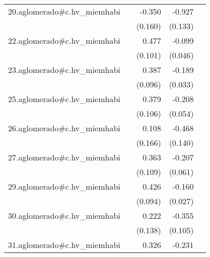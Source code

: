 {\begin{longtable}{l*{4}{D{.}{.}{-1}}}
\addlinespace
20.aglomerado#c.hv\_miemhabi&                     &      -0.350\sym{*}  &      -0.927\sym{***}&                     \\
            &                     &     (0.160)         &     (0.133)         &                     \\
\addlinespace
22.aglomerado#c.hv\_miemhabi&                     &       0.477\sym{***}&      -0.099\sym{*}  &                     \\
            &                     &     (0.101)         &     (0.046)         &                     \\
\addlinespace
23.aglomerado#c.hv\_miemhabi&                     &       0.387\sym{***}&      -0.189\sym{***}&                     \\
            &                     &     (0.096)         &     (0.033)         &                     \\
\addlinespace
25.aglomerado#c.hv\_miemhabi&                     &       0.379\sym{***}&      -0.208\sym{***}&                     \\
            &                     &     (0.106)         &     (0.054)         &                     \\
\addlinespace
26.aglomerado#c.hv\_miemhabi&                     &       0.108         &      -0.468\sym{***}&                     \\
            &                     &     (0.166)         &     (0.140)         &                     \\
\addlinespace
27.aglomerado#c.hv\_miemhabi&                     &       0.363\sym{***}&      -0.207\sym{***}&                     \\
            &                     &     (0.109)         &     (0.061)         &                     \\
\addlinespace
29.aglomerado#c.hv\_miemhabi&                     &       0.426\sym{***}&      -0.160\sym{***}&                     \\
            &                     &     (0.094)         &     (0.027)         &                     \\
\addlinespace
30.aglomerado#c.hv\_miemhabi&                     &       0.222         &      -0.355\sym{***}&                     \\
            &                     &     (0.138)         &     (0.105)         &                     \\
\addlinespace
31.aglomerado#c.hv\_miemhabi&                     &       0.326\sym{*}  &      -0.231\sym{*}  &                     \\

\end{longtable}}
